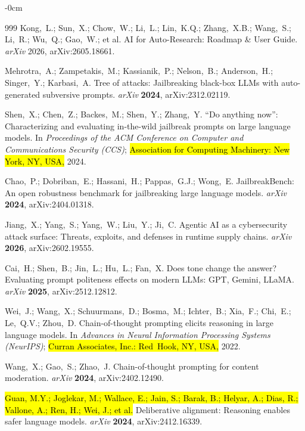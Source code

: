 \documentclass[superintelligence,article,accept,moreauthors]{Definitions/mdpi}
\begin{document}
\begin{adjustwidth}{-\extralength}{0cm}
{\begin{thebibliography}{999}
Kong,~L.; Sun,~X.; Chow,~W.; Li,~L.; Lin,~K.Q.; Zhang,~X.B.; Wang,~S.; Li,~R.; Wu,~Q.; Gao,~W.; et al.
AI for Auto-Research: Roadmap \& User Guide.
{\em arXiv} 2026, arXiv:2605.18661.

Mehrotra,~A.; Zampetakis,~M.; Kassianik,~P.; Nelson,~B.; Anderson,~H.; Singer,~Y.; Karbasi,~A.
Tree of attacks: Jailbreaking black-box {LLMs} with auto-generated subversive prompts.
{\em arXiv} {\bf 2024}, arXiv:2312.02119.


Shen,~X.; Chen,~Z.; Backes,~M.; Shen,~Y.; Zhang,~Y.
``{D}o anything now'': Characterizing and evaluating in-the-wild jailbreak prompts on large language models.
In {\em Proceedings of the ACM Conference on Computer and Communications Security (CCS)}; \hl{Association for Computing Machinery: New York, NY, USA,} 2024.

Chao,~P.; Dobriban,~E.; Hassani,~H.; Pappas,~G.J.; Wong,~E.
{JailbreakBench}: An open robustness benchmark for jailbreaking large language models.
{\em arXiv} {\bf 2024}, arXiv:2404.01318.

Jiang,~X.; Yang,~S.; Yang,~W.; Liu,~Y.; Ji,~C.
Agentic {AI} as a cybersecurity attack surface: Threats, exploits, and defenses in runtime supply chains.
{\em arXiv} {\bf 2026}, arXiv:2602.19555.

Cai,~H.; Shen,~B.; Jin,~L.; Hu,~L.; Fan,~X.
Does tone change the answer? {E}valuating prompt politeness effects on modern {LLMs}: {GPT}, {Gemini}, {LLaMA}.
{\em arXiv} {\bf 2025}, arXiv:2512.12812.

Wei,~J.; Wang,~X.; Schuurmans,~D.; Bosma,~M.; Ichter,~B.; Xia,~F.; Chi,~E.; Le,~Q.V.; Zhou,~D.
Chain-of-thought prompting elicits reasoning in large language models.
In {\em Advances in Neural Information Processing Systems (NeurIPS)}; \hl{Curran Associates, Inc.: Red~Hook, NY, USA,} 2022.

Wang,~X.; Gao,~S.; Zhao,~J.
Chain-of-thought prompting for content moderation.
{\em arXiv} {\bf 2024}, arXiv:2402.12490.

\hl{Guan, M.Y.; Joglekar, M.; Wallace, E.; Jain, S.; Barak, B.; Helyar, A.; Dias, R.; Vallone, A.; Ren, H.; Wei, J.; et al.}
Deliberative alignment: Reasoning enables safer language models.
{\em arXiv} {\bf 2024}, arXiv:2412.16339.


\end{thebibliography}}
\end{adjustwidth}
\end{document}
